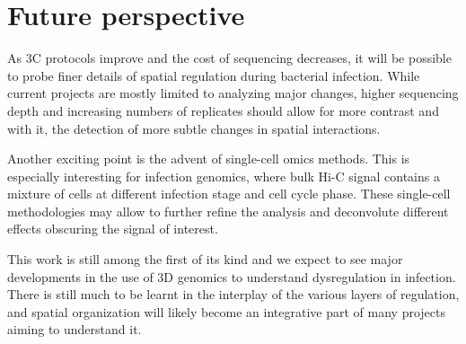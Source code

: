 
\chapter{Future perspective} %

\label{ch:03-03} %

As 3C protocols improve and the cost of sequencing decreases, it will be possible to probe finer details of spatial regulation during bacterial infection. While current projects are mostly limited to analyzing major changes, higher sequencing depth and increasing numbers of replicates should allow for more contrast and with it, the detection of more subtle changes in spatial interactions.

Another exciting point is the advent of single-cell omics methods. This is especially interesting for infection genomics, where bulk Hi-C signal contains a mixture of cells at different infection stage and cell cycle phase. These single-cell methodologies may allow to further refine the analysis and deconvolute different effects obscuring the signal of interest.

This work is still among the first of its kind and we expect to see major developments in the use of 3D genomics to understand dysregulation in infection. There is still much to be learnt in the interplay of the various layers of regulation, and spatial organization will likely become an integrative part of many projects aiming to understand it.

